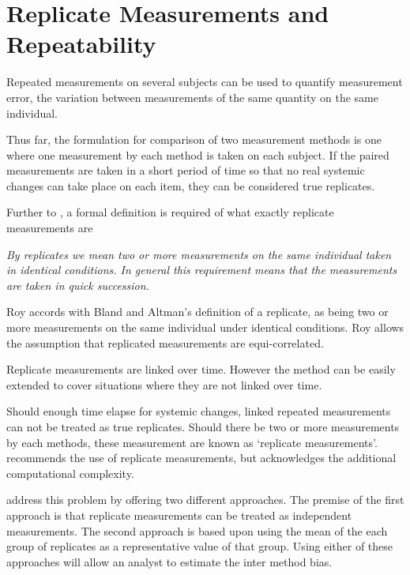 \documentclass[12pt, a4paper]{report}
\theoremstyle{plain}
\theoremstyle{definition}
\theoremstyle{remark}
\begin{document}
	
	\section{Replicate Measurements and Repeatability}
	
	
	
		
		Repeated measurements on several subjects can be used to quantify 	measurement error, the variation between measurements of the same 	quantity on the same individual.
		
	Thus far, the formulation for comparison of two measurement
	methods is one where one measurement by each method is taken on
	each subject. If the paired measurements are taken in a short period of time so that no real systemic changes can take place on each item, they can be considered true replicates.
	
	Further to \citet{BA99}, a formal definition is required of what exactly replicate measurements are
	
	\emph{By replicates we mean two or more measurements on the same
		individual taken in identical conditions. In general this requirement means that the
		measurements are taken in quick succession.}
	
	Roy accords with Bland and Altman's definition of a replicate, as being two or more measurements on the same individual under identical conditions. Roy allows the assumption that replicated measurements are equi-correlated. 
	
	Replicate measurements are linked over time. However the method can be easily extended to cover situations where they are not linked over time.
	
	 Should enough time elapse for systemic changes, linked repeated measurements can not be treated as true replicates. Should there be two or more measurements by each
	methods, these measurement are known as `replicate measurements'. \citet{BXC2008} recommends the use of replicate measurements, but acknowledges the additional computational complexity.
	
	\citet*{BA86} address this problem by offering two different approaches. The premise of the first approach is that replicate
	measurements can be treated as independent measurements. The second approach is based upon using the mean of the each group of
	replicates as a representative value of that group. Using either of these approaches will allow an analyst to estimate the inter
	method bias.
	
\end{document}
